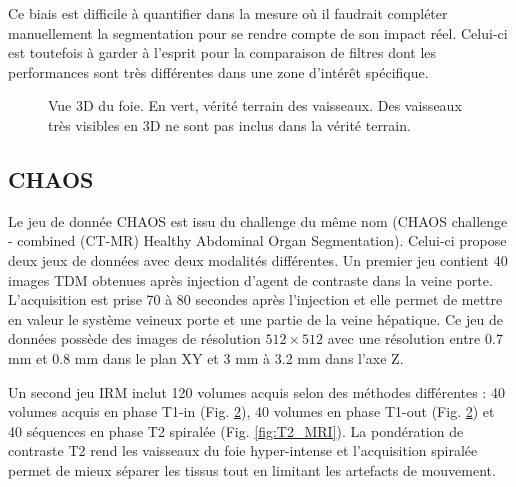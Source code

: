 Ce biais est difficile à quantifier dans la mesure où il faudrait compléter manuellement la segmentation pour se rendre compte de son impact réel. Celui-ci est toutefois à garder à l'esprit pour la comparaison de filtres dont les performances sont très différentes dans une zone d'intérêt spécifique.

\begin{figure}
    \centering
    \caption{Vue 3D du foie. En vert, vérité terrain des vaisseaux. Des vaisseaux très visibles en 3D ne sont pas inclus dans la vérité terrain.}
    \label{fig:missing_annotations}
\end{figure}

\subsection{CHAOS}

Le jeu de donnée CHAOS est issu du challenge du même nom (CHAOS challenge - combined (CT-MR) Healthy Abdominal Organ Segmentation). Celui-ci propose deux jeux de données avec deux modalités différentes. Un premier jeu contient 40 images TDM obtenues après injection d'agent de contraste dans la veine porte. L'acquisition est prise 70 à 80 secondes après l'injection et elle permet de mettre en valeur le système veineux porte et une partie de la veine hépatique. Ce jeu de données possède des images de résolution $512\times 512$ avec une résolution entre 0.7 mm et 0.8 mm dans le plan XY et 3 mm à 3.2 mm dans l'axe Z.

Un second jeu IRM inclut 120 volumes acquis selon des méthodes différentes : 40 volumes acquis en phase T1-in (Fig. \ref{fig:T1_MRI_2}), 40 volumes  en phase T1-out (Fig. \ref{fig:T1_MRI_2}) et 40 séquences en phase T2 spiralée (Fig. \ref{fig:T2_MRI}). La pondération de contraste T2 rend les vaisseaux du foie hyper-intense et l'acquisition spiralée permet de mieux séparer les tissus tout en limitant les artefacts de mouvement.

\begin{figure}
    \centering
    \caption{}
    \label{fig:T1_MRI_2}
\end{figure}

